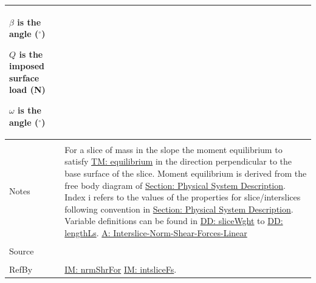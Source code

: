 \documentclass[12pt]{article}
\begin{document}
\begin{minipage}{\textwidth}
\begin{tabular}{p{} p{}}
\begin{symbDescription}
                                 \item{$β$ is the angle (${}^{\circ}$)}
                                 \item{$Q$ is the imposed surface load (N)}
                                 \item{$ω$ is the angle (${}^{\circ}$)}
                                 \end{symbDescription}
                                 \\ \midrule \\
                                 Notes & For a slice of mass in the slope the moment equilibrium to satisfy \hyperref[TM:equilibrium]{TM: equilibrium} in the direction perpendicular to the base surface of the slice. Moment equilibrium is derived from the free body diagram of \hyperref[Sec:PhysSyst]{Section: Physical System Description}. Index i refers to the values of the properties for slice/interslices following convention in \hyperref[Sec:PhysSyst]{Section: Physical System Description}. Variable definitions can be found in \hyperref[DD:sliceWght]{DD: sliceWght} to \hyperref[DD:lengthLs]{DD: lengthLs}. \hyperref[assumpINSFL]{A: Interslice-Norm-Shear-Forces-Linear}
                                         \\ \midrule \\
                                         Source & \cite{chen2005}
                                                  \\ \midrule \\
                                                  RefBy & \hyperref[IM:nrmShrFor]{IM: nrmShrFor} \hyperref[IM:intsliceFs]{IM: intsliceFs}.
\\ \bottomrule \end{tabular}
\end{minipage}\\
\end{document}
